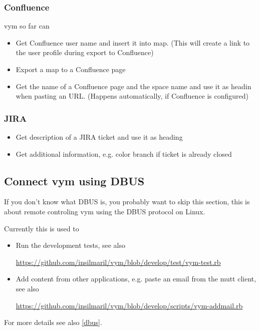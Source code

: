 \documentclass[12pt,a4paper]{article}
\newcommand{\vym}{{\sc vym }}
\begin{document}
\subsubsection{Confluence}
\vym so far can
\begin{itemize}
    \item Get Confluence user name and insert it into map. (This will
        create a link to the user profile during export to Confluence)
    \item Export a map to a Confluence page
    \item Get the name of a Confluence page and the space name and use
        it as headin when pasting an URL. (Happens automatically, if
        Confluence is configured)
\end{itemize}

\subsubsection{JIRA}
\begin{itemize}
    \item Get description of a JIRA ticket and use it as heading
    \item Get additional information, e.g. color branch if ticket is
        already closed
\end{itemize}

\subsection{Connect vym using DBUS}
If you don't know what DBUS is, you probably want to skip this section,
this is about remote controling \vym using the DBUS protocol on Linux.

Currently this is used to
\begin{itemize}
    \item Run the development tests, see also 

        \href{https://github.com/insilmaril/vym/blob/develop/test/vym-test.rb}
        {https://github.com/insilmaril/vym/blob/develop/test/vym-test.rb}
    \item Add content from other applications, e.g. paste an email from
        the mutt client, see also 

        \href{https://github.com/insilmaril/vym/blob/develop/scripts/vym-addmail.rb}
        {https://github.com/insilmaril/vym/blob/develop/scripts/vym-addmail.rb}
\end{itemize}
For more details see also \ref{dbus}.
\end{document}
